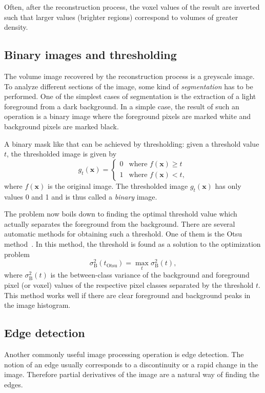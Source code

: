 \documentclass[a4paper,twoside,12pt]{article}
\begin{document}
Often, after the reconstruction process, the voxel values of the result are inverted such that larger values (brighter regions) correspond to volumes of greater density.

\subsection{Binary images and thresholding}
\label{sec:thresholding}
The volume image recovered by the reconstruction process is a greyscale image. To analyze different sections of the image, some kind of \emph{segmentation} has to be performed. One of the simplest cases of segmentation is the extraction of a light foreground from a dark background. In a simple case, the result of such an operation is a binary image where the foreground pixels are marked white and background pixels are marked black.

A binary mask like that can be achieved by thresholding: given a threshold value $t$, the thresholded image is given by
\begin{equation}
    \label{eq:threshold}
    g_t(\mathbf{x}) = \begin{cases}
        0 & \text{where } f(\mathbf{x}) \geq t \\
        1 & \text{where } f(\mathbf{x}) < t,
    \end{cases}
\end{equation}
where $f(\mathbf{x})$ is the original image. The thresholded image $g_t(\mathbf{x})$ has only values 0 and 1 and is thus called a \emph{binary} image.

The problem now boils down to finding the optimal threshold value which actually separates the foreground from the background. There are several automatic methods for obtaining such a threshold. One of them is the Otsu method~\cite{otsu}. In this method, the threshold is found as a solution to the optimization problem
\[
    \sigma_\text{B}^2(t_\text{Otsu}) = \max\limits_t \sigma_\text{B}^2(t),
\]
where $\sigma_\text{B}^2(t)$ is the between-class variance of the background and foreground pixel (or voxel) values of the respective pixel classes separated by the threshold $t$. This method works well if there are clear foreground and background peaks in the image histogram.

\subsection{Edge detection}
Another commonly useful image processing operation is edge detection. The notion of an edge usually corresponds to a discontinuity or a rapid change in the image. Therefore partial derivatives of the image are a natural way of finding the edges.
\end{document}
